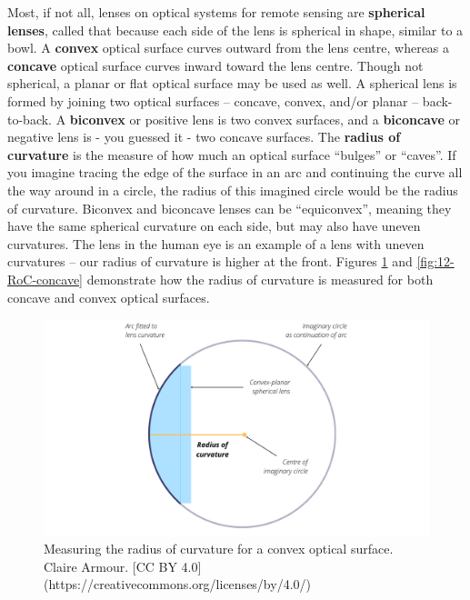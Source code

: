 \documentclass[
]{book}
\begin{document}
Most, if not all, lenses on optical systems for remote sensing are \textbf{spherical lenses}, called that because each side of the lens is spherical in shape, similar to a bowl. A \textbf{convex} optical surface curves outward from the lens centre, whereas a \textbf{concave} optical surface curves inward toward the lens centre. Though not spherical, a planar or flat optical surface may be used as well. A spherical lens is formed by joining two optical surfaces -- concave, convex, and/or planar -- back-to-back. A \textbf{biconvex} or positive lens is two convex surfaces, and a \textbf{biconcave} or negative lens is - you guessed it - two concave surfaces. The \textbf{radius of curvature} is the measure of how much an optical surface ``bulges'' or ``caves''. If you imagine tracing the edge of the surface in an arc and continuing the curve all the way around in a circle, the radius of this imagined circle would be the radius of curvature. Biconvex and biconcave lenses can be ``equiconvex'', meaning they have the same spherical curvature on each side, but may also have uneven curvatures. The lens in the human eye is an example of a lens with uneven curvatures -- our radius of curvature is higher at the front. Figures \ref{fig:12-RoC-convex} and \ref{fig:12-RoC-concave} demonstrate how the radius of curvature is measured for both concave and convex optical surfaces.

\begin{figure}
\includegraphics[width=0.9\linewidth]{images/12-ROC_convex} \caption{Measuring the radius of curvature for a convex optical surface. Claire Armour. [CC BY 4.0](https://creativecommons.org/licenses/by/4.0/)}\label{fig:12-RoC-convex}
\end{figure}
\end{document}
